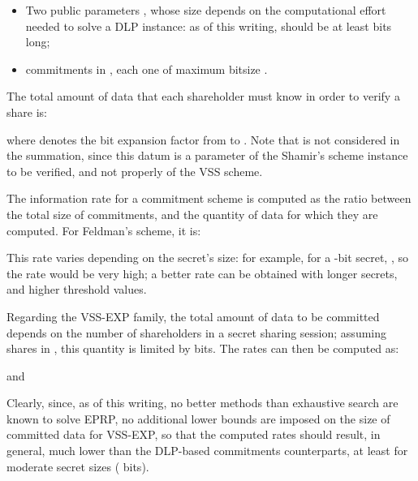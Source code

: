 \documentclass[10pt,journal,cspaper,compsoc]{IEEEtran}
\begin{document}
\begin{itemize}
\item Two public parameters , whose size depends on the computational effort needed to solve a DLP instance: as of this writing,  should be at least  bits long;
\item  commitments in , each one of maximum bitsize .
\end{itemize}

The total amount of data that each shareholder must know in order to verify a share is:

where  denotes the bit expansion factor from  to .
Note that  is not considered in the summation, since this datum is a parameter of the Shamir's scheme instance to be verified, and not properly of the VSS scheme. 

The information rate for a commitment scheme is computed as the ratio between the total size of commitments, and the quantity of data for which they are computed. For Feldman's scheme, it is:

This rate varies depending on the secret's size: for example, for a -bit secret, , so the rate would be very high; a better rate can be obtained with longer secrets, and higher threshold values.

Regarding the VSS-EXP family, the total amount of data to be committed depends on the number of shareholders  in a secret sharing session; assuming shares in , this quantity is limited by  bits. The rates can then be computed as:

and


Clearly, since, as of this writing, no better methods than exhaustive search are known to solve EPRP, no additional lower bounds are imposed on the size of committed data for VSS-EXP, so that the computed rates should result, in general, much lower than the DLP-based commitments counterparts, at least for moderate secret sizes ( bits).
\end{document}
